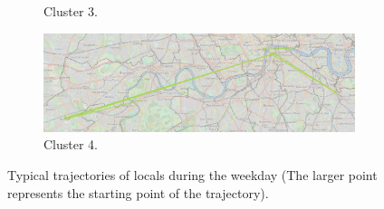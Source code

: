 \documentclass{article}
\theoremstyle{definition}
\theoremstyle{remark}
\begin{document}
\begin{figure}[!h]
\begin{subfigure}{0.6\textheight}
\caption{Cluster 3.}
\label{fig:weekday_locals_c3}
\end{subfigure}
\begin{subfigure}{0.6\textheight}
\centering
\includegraphics[width=0.4\linewidth]{figures/weekday_locals_c4.png}
\caption{Cluster 4.}
\label{fig:weekday_locals_c4}
\end{subfigure}

\caption{Typical trajectories of locals during the weekday (The larger point represents the starting point of the trajectory).}
\label{fig:sequences_weekday_locals}
\end{figure}
\end{document}
